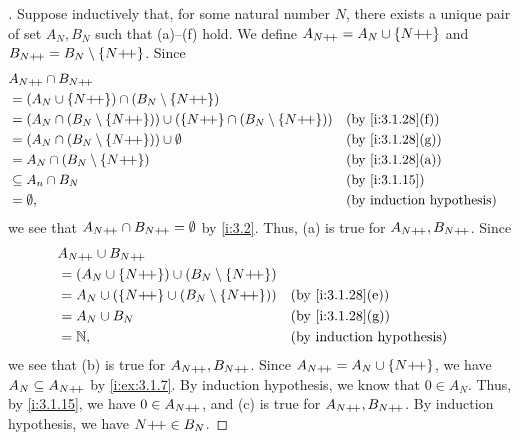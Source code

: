 \begin{proof}[]
  Suppose inductively that, for some natural number \(N\), there exists a unique pair of set \(A_N, B_N\) such that (a)--(f) hold.
  We define \(A_{N{+}\!{+}} = A_N \cup \left\lbrace N{+}\!{+}\right\rbrace\) and \(B_{N{+}\!{+}} = B_N \setminus \left\lbrace N{+}\!{+}\right\rbrace\).
  Since
  \begin{align*}
     & A_{N\pp} \cap B_{N\pp}                                                                                          \\
     & = (A_N \cup \set{N\pp}) \cap (B_N \setminus \set{N\pp})                                                         \\
     & = (A_N \cap (B_N \setminus \set{N\pp})) \cup (\set{N\pp} \cap (B_N \setminus \set{N\pp})) &  & \by{i:3.1.28}[f] \\
     & = (A_N \cap (B_N \setminus \set{N\pp})) \cup \emptyset                                    &  & \by{i:3.1.28}[g] \\
     & = A_N \cap (B_N \setminus \set{N\pp})                                                     &  & \by{i:3.1.28}[a] \\
     & \subseteq A_n \cap B_N                                                                    &  & \by{i:3.1.15}    \\
     & = \emptyset,                                                                              &  & \byIH
  \end{align*}
  we see that \(A_{N{+}\!{+}} \cap B_{N{+}\!{+}} = \emptyset\) by \cref{i:3.2}.
  Thus, (a) is true for \(A_{N{+}\!{+}}, B_{N{+}\!{+}}\).
  Since
  \begin{align*}
     & A_{N\pp} \cup B_{N\pp}                                                        \\
     & = (A_N \cup \set{N\pp}) \cup (B_N \setminus \set{N\pp})                       \\
     & = A_N \cup (\set{N\pp} \cup (B_N \setminus \set{N\pp})) &  & \by{i:3.1.28}[e] \\
     & = A_N \cup B_N                                          &  & \by{i:3.1.28}[g] \\
     & = \N,                                                   &  & \byIH
  \end{align*}
  we see that (b) is true for \(A_{N{+}\!{+}}, B_{N{+}\!{+}}\).
  Since \(A_{N{+}\!{+}} = A_N \cup \left\lbrace N{+}\!{+}\right\rbrace\), we have \(A_N \subseteq A_{N{+}\!{+}}\) by \cref{i:ex:3.1.7}.
  By induction hypothesis, we know that \(0 \in A_N\).
  Thus, by \cref{i:3.1.15}, we have \(0 \in A_{N{+}\!{+}}\), and (c) is true for \(A_{N{+}\!{+}}, B_{N{+}\!{+}}\).
  By induction hypothesis, we have \(N{+}\!{+} \in B_N\).

\end{proof}
